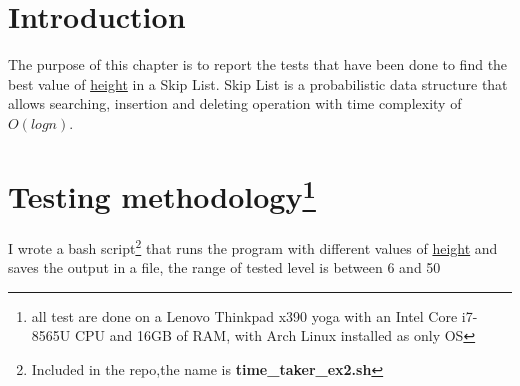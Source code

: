 \section{Introduction}
The purpose of this chapter is to report the tests that have been done to find the best value of \underline{height} in a Skip List.
Skip List is a probabilistic data structure that allows searching, insertion and deleting operation with time complexity of $O(log n)$.

\section{Testing methodology\footnote{all test are done on a Lenovo Thinkpad x390 yoga with an Intel Core i7-8565U CPU and 16GB of RAM, with Arch Linux installed as only OS}}
I wrote a bash script\footnote{Included in the repo,the name is \textbf{time\_taker\_ex2.sh}} that runs the program with different values of \underline{height} and saves the output in a file, the range of tested level is between 6 and 50
\newline
